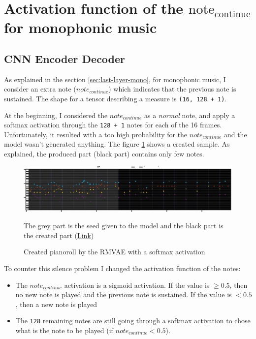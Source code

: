 \documentclass[12pt]{report}
\begin{document}


\section{Activation function of the $\text{note}_{\text{continue}}$ for monophonic music}
\label{sec:results:note-continue}

\subsection{CNN Encoder Decoder}

As explained in the section \ref{sec:last-layer-mono}, for monophonic music, I consider an extra note ($note_{continue}$) which indicates that the previous note is sustained.
The shape for a tensor describing a measure is \texttt{(16, 128 + 1)}.

At the beginning, I considered the $note_{continue}$ as a \textit{normal} note, and apply a softmax activation through the \texttt{128 + 1} notes for each of the 16 frames.
Unfortunately, it resulted with a too high probability for the $note_{continue}$ and the model wasn't generated anything.
The figure \ref{fig:rmvae-generated-silence} shows a created sample.
As explained, the produced part (black part) contains only few notes.

\begin{figure}[htbp]
    \centering
    \includegraphics[width=\textwidth]{images/generated_midis/RMVAE/cnn_generation_silence.jpg}
    \caption{Created pianoroll by the RMVAE with a softmax activation}
    The grey part is the seed given to the model and the black part is the created part
    (\href{https://github.com/ValentinVignal/midiGenerator/blob/master/samples/results/generated_silence.mid}{Link})
    \label{fig:rmvae-generated-silence}
\end{figure}

To counter this silence problem I changed the activation function of the notes:
\begin{itemize}
    \item The $note_{continue}$ activation is a sigmoid activation.
    If the value is $\geq 0.5$, then no new note is played and the previous note is sustained.
    If the value is $< 0.5$, then a new note is played
    \item The \texttt{128} remaining notes are still going through a softmax activation to chose what is the note to be played (if $note_{continue} <0.5$).
\end{itemize}
\end{document}
